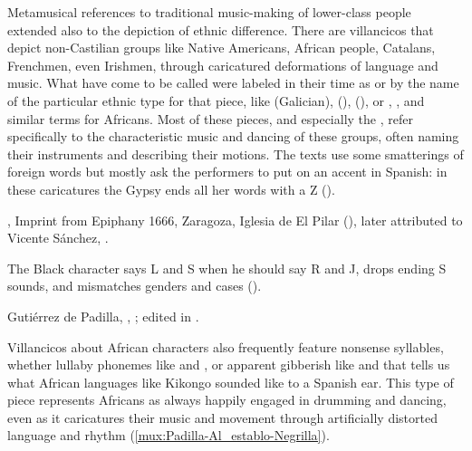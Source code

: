 Metamusical references to traditional music-making of lower-class people
extended also to the depiction of ethnic difference.
There are villancicos that depict non-Castilian groups like Native Americans,
African people, Catalans, Frenchmen, even Irishmen, through caricatured
deformations of language and music.%
    \Autocites
    {Baker:EthnicVC}
    {Baker:PerformancePostColonial}
    {Davies:LocalContent}
    {AlvesSimao:VillancicosDeNegros}
    {Molinero:Negros}
    {Santamaria:Negrillas}
    {Goldberg:SonidosNegros}
What have come to be called  were labeled in their
time as  or by the name of the particular ethnic
type for that piece, like  (Galician), 
(),  (), or ,
, and similar terms for Africans.
Most of these pieces, and especially the , refer
specifically to the characteristic music and dancing of these groups, often
naming their instruments and describing their motions.
The texts use some smatterings of foreign words but mostly ask the performers
to put on an accent in Spanish: in these caricatures the Gypsy ends all her
words with a Z ().
\begin{Footnote}
    , Imprint from Epiphany 1666, Zaragoza,
    Iglesia de El Pilar (), later attributed to Vicente
    Sánchez, .
\end{Footnote}
The Black character says L and S when he should say R and J, drops ending S
sounds, and mismatches genders and cases ().%
\begin{Footnote}
    Gutiérrez de Padilla, ,
    ; edited in \autocite{Cashner:WLSCM32}.
\end{Footnote}
Villancicos about African characters also frequently feature nonsense
syllables, whether lullaby phonemes like  and , or apparent gibberish like  and
 that tells us what African languages like Kikongo
sounded like to a Spanish ear.
This type of piece represents Africans as always happily engaged in drumming
and dancing, even as it caricatures their music and movement through
artificially distorted language and rhythm
(\cref{mux:Padilla-Al_establo-Negrilla}).

